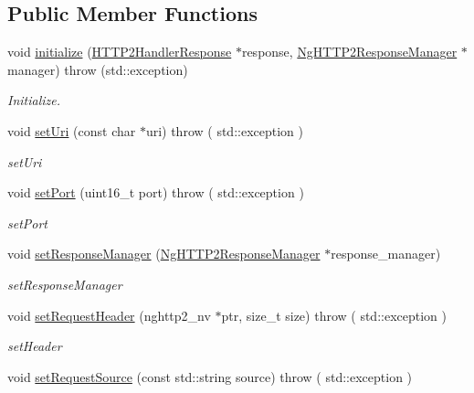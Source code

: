 \subsection*{Public Member Functions}
\begin{DoxyCompactItemize}
\item 
void \hyperlink{classNetwork_1_1HTTP2_1_1NgHTTP2Handler_a8fda32f531a6a3946dc861b06c519c95}{initialize} (\hyperlink{structNetwork_1_1HTTP2_1_1HTTP2HandlerResponse}{H\+T\+T\+P2\+Handler\+Response} $\ast$response, \hyperlink{classNetwork_1_1HTTP2_1_1NgHTTP2ResponseManager}{Ng\+H\+T\+T\+P2\+Response\+Manager} $\ast$manager)  throw (std\+::exception)
\begin{DoxyCompactList}\small\item\em Initialize. \end{DoxyCompactList}\item 
void \hyperlink{classNetwork_1_1HTTP2_1_1NgHTTP2Handler_a2384e4c12557cd181915dd33775b8a1a}{set\+Uri} (const char $\ast$uri)  throw ( std\+::exception )
\begin{DoxyCompactList}\small\item\em set\+Uri \end{DoxyCompactList}\item 
void \hyperlink{classNetwork_1_1HTTP2_1_1NgHTTP2Handler_af86bb397ae186757cd84d74954471e43}{set\+Port} (uint16\+\_\+t port)  throw ( std\+::exception )
\begin{DoxyCompactList}\small\item\em set\+Port \end{DoxyCompactList}\item 
void \hyperlink{classNetwork_1_1HTTP2_1_1NgHTTP2Handler_add84d25ff765f24e971b1c3177ef17a8}{set\+Response\+Manager} (\hyperlink{classNetwork_1_1HTTP2_1_1NgHTTP2ResponseManager}{Ng\+H\+T\+T\+P2\+Response\+Manager} $\ast$response\+\_\+manager)
\begin{DoxyCompactList}\small\item\em set\+Response\+Manager \end{DoxyCompactList}\item 
void \hyperlink{classNetwork_1_1HTTP2_1_1NgHTTP2Handler_a71d2ba66b9296604b81c440d1c54f670}{set\+Request\+Header} (nghttp2\+\_\+nv $\ast$ptr, size\+\_\+t size)  throw ( std\+::exception )
\begin{DoxyCompactList}\small\item\em set\+Header \end{DoxyCompactList}\item 
void \hyperlink{classNetwork_1_1HTTP2_1_1NgHTTP2Handler_acfa6474084f1a11dd9026ea8078d6b96}{set\+Request\+Source} (const std\+::string source)  throw ( std\+::exception )

\end{DoxyCompactItemize}
